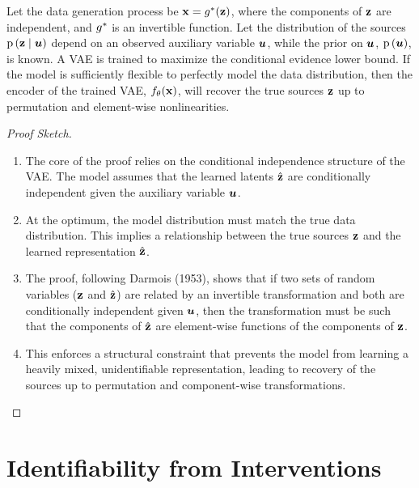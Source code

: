 \documentclass{article}
\begin{document}
\begin{theorem}
Let the data generation process be ${\mathbf{x}} = g^*({\mathbf{z}})$, where the components of ${\mathbf{z}}$ are independent, and $g^*$ is an invertible function. Let the distribution of the sources $\operatorname{p}\left({\mathbf{z}} \mid {\bm{u}}\right)$ depend on an observed auxiliary variable ${\bm{u}}$, while the prior on ${\bm{u}}$, $\operatorname{p}\left({\bm{u}}\right)$, is known. A VAE is trained to maximize the conditional evidence lower bound. If the model is sufficiently flexible to perfectly model the data distribution, then the encoder of the trained VAE, $f_\theta({\mathbf{x}})$, will recover the true sources ${\mathbf{z}}$ up to permutation and element-wise nonlinearities.
\end{theorem}

\begin{proof}[Proof Sketch]
\begin{enumerate}
    \item The core of the proof relies on the conditional independence structure of the VAE. The model assumes that the learned latents $\hat{{\mathbf{z}}}$ are conditionally independent given the auxiliary variable ${\bm{u}}$.
    \item At the optimum, the model distribution must match the true data distribution. This implies a relationship between the true sources ${\mathbf{z}}$ and the learned representation $\hat{{\mathbf{z}}}$.
    \item The proof, following Darmois (1953), shows that if two sets of random variables (${\mathbf{z}}$ and $\hat{{\mathbf{z}}}$) are related by an invertible transformation and both are conditionally independent given ${\bm{u}}$, then the transformation must be such that the components of $\hat{{\mathbf{z}}}$ are element-wise functions of the components of ${\mathbf{z}}$.
    \item This enforces a structural constraint that prevents the model from learning a heavily mixed, unidentifiable representation, leading to recovery of the sources up to permutation and component-wise transformations.
\end{enumerate}
\end{proof}

\section{Identifiability from Interventions}
\end{document}
